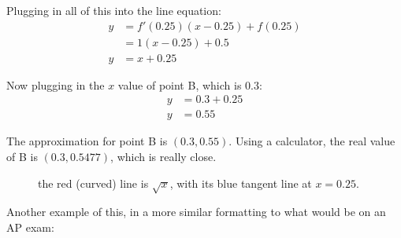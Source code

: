 \documentclass[12pt]{article}
\begin{document}
\noindent Plugging in all of this into the line equation:
\begin{align*}
    y & = f'(0.25)(x-0.25) + f(0.25) \\
      & = 1(x-0.25) + 0.5            \\
    y & = x+0.25
\end{align*}

\noindent Now plugging in the $x$ value of point B, which is $0.3$:
\begin{align*}
    y & = 0.3 + 0.25 \\
    y & = 0.55
\end{align*}

The approximation for point B is $(0.3, 0.55)$. Using a calculator, the real value of B is $(0.3, 0.5477)$, which is really close.

\begin{figure}[h]
    \begin{center}
        \caption{the red (curved) line is $\sqrt{x}$, with its blue tangent line at $x=0.25$.}
        \label{fig:locallinapprox}
    \end{center}
\end{figure}

Another example of this, in a more similar formatting to what would be on an AP exam:
\end{document}
